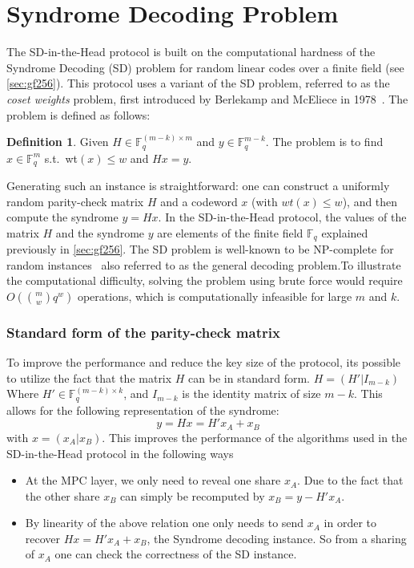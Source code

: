 \documentclass[11pt]{report}
\theoremstyle{definition}
\newtheorem{definition}{Definition}[section]
\theoremstyle{plain}
\begin{document}
\section{Syndrome Decoding Problem}\label{sec:syndrome}

The SD-in-the-Head protocol is built on the computational hardness of the Syndrome Decoding (SD) problem for random linear codes over a finite field (see \autoref{sec:gf256}). This protocol uses a variant of the SD problem, referred to as the \textit{coset weights} problem, first introduced by Berlekamp and McEliece in 1978~\cite{berlekamp1978inherent}. The problem is defined as follows:
\begin{definition}\label{def:syndrome}
  Given $H \in \mathbb{F}^{(m-k)\times m}_q$ and $y \in \mathbb{F}^{m-k}_q$. The problem is to find $x \in \mathbb{F}^m_q$ s.t.\ wt$(x) \leq w$ and $Hx = y$.
\end{definition}
Generating such an instance is straightforward: one can construct a uniformly random parity-check matrix $H$ and a codeword $x$ (with $wt(x) \leq w$), and then compute the syndrome $y = Hx$. In the SD-in-the-Head protocol, the values of the matrix $H$ and the syndrome $y$ are elements of the finite field $\mathbb{F}_q$ explained previously in \autoref{sec:gf256}. The SD problem is well-known to be NP-complete for random instances~\cite{berlekamp1978inherent} also referred to as the general decoding problem.To illustrate the computational difficulty, solving the problem using brute force would require $O(\binom{m}{w} q^w)$ operations, which is computationally infeasible for large $m$ and $k$.

\subsubsection{Standard form of the parity-check matrix}\label{sub:standard_form_of_the_parity_check_matrix}
To improve the performance and reduce the key size of the protocol, its possible to utilize the fact that the matrix $H$ can be in standard form. $H = (H'|I_{m-k}) $ Where $H' \in \mathbb{F}^{(m-k)\times k}_q$, and $I_{m-k}$ is the identity matrix of size $m-k$. This allows for the following representation of the syndrome:
\begin{equation}
  y = Hx = H'x_A + x_B\label{eq:standard_form_of_the_parity_check_matrix}
\end{equation}
with $x = (x_A | x_B)$. This improves the performance of the algorithms used in the SD-in-the-Head protocol in the following ways
\begin{itemize}
  \item At the MPC layer, we only need to reveal one share $x_A$. Due to the fact that the other share $x_B$ can simply be recomputed by $x_B = y - H'x_A$.
  \item By linearity of the above relation one only needs to send $x_A$ in order to recover $Hx = H'x_A + x_B$, the Syndrome decoding instance. So from a sharing of $x_A$ one can check the correctness of the SD instance.
\end{itemize}
\end{document}
